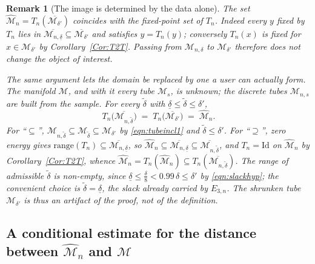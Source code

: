 \documentclass[11pt]{amsart}%
\theoremstyle{plain}
\newtheorem{remark}[definition]{Remark}
\newcommand{\1}{\mathbf{1}}
\newcommand{\M}{\mathcal{M}}
\begin{document}
\begin{remark}[The image is determined by the data alone]
    \label{Rem:ImageFromData}
    The set $\widehat{\M}_n=T_n(\overline{\M_{\delta'}})$ coincides with the fixed-point set of
    $T_n$. Indeed every $y$ fixed by $T_n$ lies in $\overline{\M_{n,\underline\delta}}\subseteq
    \overline{\M_{\delta'}}$ and satisfies $y=T_n(y)$; conversely $T_n(x)$ is fixed for
    $x\in \M_{\delta'}$ by Corollary~\ref{Cor:T2T}. Passing from $\M_{n,\delta}$ to
    $\M_{\delta'}$ therefore does not change the object of interest.

    The same argument lets the domain be replaced by one a user can actually form. The manifold
    $\M$, and with it every tube $\M_s$, is unknown; the discrete tubes $\M_{n,s}$ are built from
    the sample. For every $\tilde\delta$ with $\underline\delta\le\tilde\delta\le\delta'$,
    \begin{equation}\label{eqn:imagefromdata}
        T_n\bigl(\overline{\M_{n,\tilde\delta}}\bigr)\;=\;T_n\bigl(\overline{\M_{\delta'}}\bigr)
        \;=\;\widehat{\M}_n .
    \end{equation}
    For ``$\subseteq$'', $\M_{n,\tilde\delta}\subseteq\M_{\tilde\delta}\subseteq\M_{\delta'}$ by
    \eqref{eqn:tubeincl1} and $\tilde\delta\le\delta'$. For ``$\supseteq$'', zero energy gives
    $\mathrm{range}(T_n)\subseteq\overline{\M_{n,\underline\delta}}$, so
    $\widehat{\M}_n\subseteq\overline{\M_{n,\underline\delta}}\subseteq
    \overline{\M_{n,\tilde\delta}}$, and $T_n=\mathrm{Id}$ on $\widehat{\M}_n$ by
    Corollary~\ref{Cor:T2T}, whence
    $\widehat{\M}_n=T_n(\widehat{\M}_n)\subseteq T_n(\overline{\M_{n,\tilde\delta}})$. The range of
    admissible $\tilde\delta$ is non-empty, since $\underline\delta\le\frac{\delta}{8}<0.99\,\delta\le\delta'$
    by \eqref{eqn:slackhyp}; the convenient choice is $\tilde\delta=\underline\delta$, the slack
    already carried by $E_{3,n}$. The shrunken tube $\M_{\delta'}$ is thus an artifact of the
    proof, not of the definition.
\end{remark}


\subsection{A conditional estimate for the distance between \texorpdfstring{$\widehat{\M}_n$ and $\M$}{Mn and M}}
\label{SSec:CondEstDistM}
\end{document}
